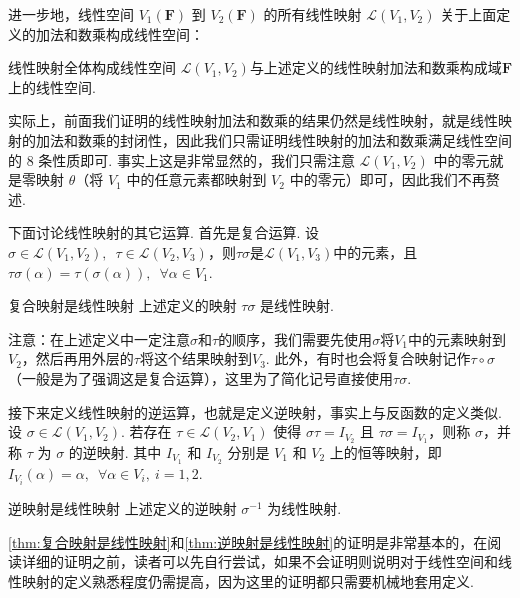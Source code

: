 进一步地，线性空间 $V_1(\mathbf{F})$ 到 $V_2(\mathbf{F})$ 的所有线性映射 $\mathcal{L}(V_1,V_2)$ 关于上面定义的加法和数乘构成线性空间：

\begin{theorem}{}{线性映射全体构成线性空间}
    $\mathcal{L}(V_1,V_2)$与上述定义的线性映射加法和数乘构成域$\mathbf{F}$上的线性空间.
\end{theorem}

实际上，前面我们证明的线性映射加法和数乘的结果仍然是线性映射，就是线性映射的加法和数乘的封闭性，因此我们只需证明线性映射的加法和数乘满足线性空间的 8 条性质即可. 事实上这是非常显然的，我们只需注意 $\mathcal{L}(V_1,V_2)$ 中的零元就是零映射 $\theta$（将 $V_1$ 中的任意元素都映射到 $V_2$ 中的零元）即可，因此我们不再赘述.

下面讨论线性映射的其它运算. 首先是复合运算. 设$\sigma \in \mathcal{L}(V_1,V_2),\enspace\tau \in \mathcal{L}(V_2,V_3)$，则$\tau\sigma$是$\mathcal{L}(V_1,V_3)$中的元素，且$\tau\sigma(\alpha)=\tau(\sigma(\alpha)),\enspace\forall \alpha \in V_1$.

\begin{theorem}{}{复合映射是线性映射}
    上述定义的映射 $\tau\sigma$ 是线性映射.
\end{theorem}

注意：在上述定义中一定注意$\sigma$和$\tau$的顺序，我们需要先使用$\sigma$将$V_1$中的元素映射到$V_2$，然后再用外层的$\tau$将这个结果映射到$V_3$. 此外，有时也会将复合映射记作$\tau \circ \sigma$（一般是为了强调这是复合运算），这里为了简化记号直接使用$\tau\sigma$.

接下来定义线性映射的逆运算，也就是定义逆映射，事实上与反函数的定义类似. 设 $\sigma \in \mathcal{L}(V_1,V_2)$. 若存在 $\tau \in \mathcal{L}(V_2,V_1)$ 使得 $\sigma \tau = I_{V_2}$ 且 $\tau \sigma = I_{V_1}$，则称 $\sigma$，并称 $\tau$ 为 $\sigma$ 的逆映射. 其中 $I_{V_1}$ 和 $I_{V_2}$ 分别是 $V_1$ 和 $V_2$ 上的恒等映射，即 $I_{V_i}(\alpha)=\alpha,\enspace \forall \alpha \in V_i,\ i = 1, 2$.

\begin{theorem}{}{逆映射是线性映射}
    上述定义的逆映射 $\sigma^{-1}$ 为线性映射.
\end{theorem}

\autoref{thm:复合映射是线性映射}和\autoref{thm:逆映射是线性映射}的证明是非常基本的，在阅读详细的证明之前，读者可以先自行尝试，如果不会证明则说明对于线性空间和线性映射的定义熟悉程度仍需提高，因为这里的证明都只需要机械地套用定义.

